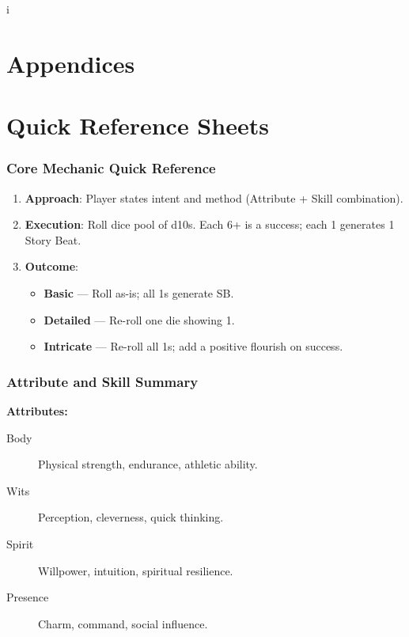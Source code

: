 i\chapter{Appendices}
\label{chap:appendices}

\renewcommand{\arraystretch}{1.15}
\newcommand{\feTableStart}{\rowcolors{2}{FeRow}{white}\small}
\newcommand{\feTableEnd}{\rowcolors{2}{}{}}
\appendix
\chapter{Quick Reference Sheets}
\label{sec:quick-reference}

\subsection{Core Mechanic Quick Reference}
\label{subsec:core-mechanic-ref}

\begin{enumerate}
\item \textbf{Approach}: Player states intent and method (Attribute + Skill combination).
\item \textbf{Execution}: Roll dice pool of d10s. Each 6+ is a success; each 1 generates 1 Story Beat.
\item \textbf{Outcome}:
  \begin{itemize}
  \item \textbf{Basic} — Roll as-is; all 1s generate SB.
  \item \textbf{Detailed} — Re-roll one die showing 1.
  \item \textbf{Intricate} — Re-roll all 1s; add a positive flourish on success.
  \end{itemize}
\end{enumerate}

\subsection{Attribute and Skill Summary}
\label{subsec:attributes-skills-ref}

\textbf{Attributes:}
\begin{description}
\item[Body] Physical strength, endurance, athletic ability.
\item[Wits] Perception, cleverness, quick thinking.
\item[Spirit] Willpower, intuition, spiritual resilience.
\item[Presence] Charm, command, social influence.
\end{description}

